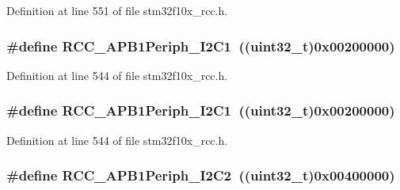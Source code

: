 Definition at line 551 of file stm32f10x\+\_\+rcc.\+h.

\subsubsection[{\texorpdfstring{R\+C\+C\+\_\+\+A\+P\+B1\+Periph\+\_\+\+I2\+C1}{RCC_APB1Periph_I2C1}}]{\setlength{\rightskip}{0pt plus 5cm}\#define R\+C\+C\+\_\+\+A\+P\+B1\+Periph\+\_\+\+I2\+C1~(({\bf uint32\+\_\+t})0x00200000)}\hypertarget{group___a_p_b1__peripheral_ga594f87d504f7d63697d841033d1538f6}{}\label{group___a_p_b1__peripheral_ga594f87d504f7d63697d841033d1538f6}


Definition at line 544 of file stm32f10x\+\_\+rcc.\+h.

\subsubsection[{\texorpdfstring{R\+C\+C\+\_\+\+A\+P\+B1\+Periph\+\_\+\+I2\+C1}{RCC_APB1Periph_I2C1}}]{\setlength{\rightskip}{0pt plus 5cm}\#define R\+C\+C\+\_\+\+A\+P\+B1\+Periph\+\_\+\+I2\+C1~(({\bf uint32\+\_\+t})0x00200000)}\hypertarget{group___a_p_b1__peripheral_ga594f87d504f7d63697d841033d1538f6}{}\label{group___a_p_b1__peripheral_ga594f87d504f7d63697d841033d1538f6}


Definition at line 544 of file stm32f10x\+\_\+rcc.\+h.

\subsubsection[{\texorpdfstring{R\+C\+C\+\_\+\+A\+P\+B1\+Periph\+\_\+\+I2\+C2}{RCC_APB1Periph_I2C2}}]{\setlength{\rightskip}{0pt plus 5cm}\#define R\+C\+C\+\_\+\+A\+P\+B1\+Periph\+\_\+\+I2\+C2~(({\bf uint32\+\_\+t})0x00400000)}\hypertarget{group___a_p_b1__peripheral_ga8eaeded403b5a2277fbfb3896c639416}{}\label{group___a_p_b1__peripheral_ga8eaeded403b5a2277fbfb3896c639416}


